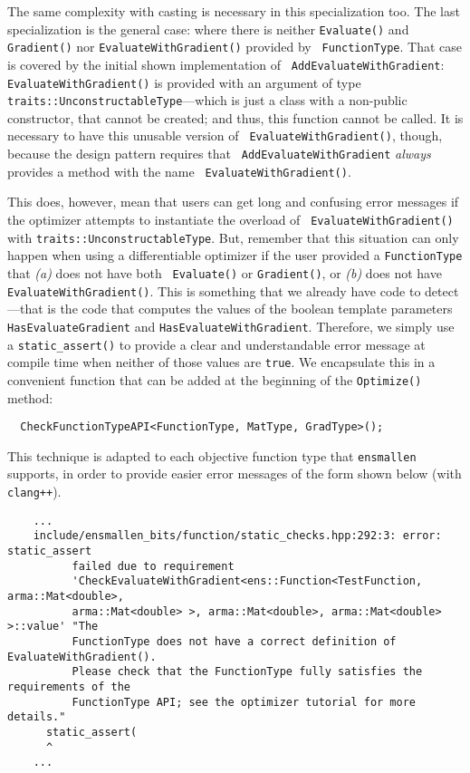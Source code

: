 The same complexity with casting is necessary in this specialization too.  The
last specialization is the general case: where there is neither {\tt Evaluate()}
and {\tt Gradient()} nor {\tt EvaluateWithGradient()} provided by {\tt
FunctionType}.  That case is covered by the initial shown implementation of {\tt
AddEvaluateWithGradient}: {\tt EvaluateWithGradient()} is provided with an
argument of type {\tt traits::UnconstructableType}---which is just a class with
a non-public constructor, that cannot be created; and thus, this function cannot
be called.  It is necessary to have this unusable version of {\tt
EvaluateWithGradient()}, though, because the design pattern requires that {\tt
AddEvaluateWithGradient} {\em always} provides a method with the name {\tt
EvaluateWithGradient()}.

This does, however, mean that users can get long and confusing error messages if
the optimizer attempts to instantiate the overload of {\tt
EvaluateWithGradient()} with {\tt traits::UnconstructableType}.  But, remember
that this situation can only happen when using a differentiable optimizer if
the user provided a {\tt FunctionType} that {\it (a)} does not have both {\tt
Evaluate()} or {\tt Gradient()}, or {\it (b)} does not have {\tt
EvaluateWithGradient()}.  This is something that we already have code to
detect---that is the code that computes the values of the boolean template
parameters {\tt HasEvaluateGradient} and {\tt HasEvaluateWithGradient}.
Therefore, we simply use a {\tt static\_assert()} to provide a clear and
understandable error message at compile time when neither of those values are
{\tt true}.  We encapsulate this in a convenient function that can be added at
the beginning of the {\tt Optimize()} method:

\begin{verbatim}
  CheckFunctionTypeAPI<FunctionType, MatType, GradType>();
\end{verbatim}

This technique is adapted to each objective function type that {\tt ensmallen}
supports, in order to provide easier error messages of the form shown below
(with {\tt clang++}).

\begin{verbatim}
    ...
    include/ensmallen_bits/function/static_checks.hpp:292:3: error: static_assert
          failed due to requirement
          'CheckEvaluateWithGradient<ens::Function<TestFunction, arma::Mat<double>,
          arma::Mat<double> >, arma::Mat<double>, arma::Mat<double> >::value' "The
          FunctionType does not have a correct definition of EvaluateWithGradient().
          Please check that the FunctionType fully satisfies the requirements of the
          FunctionType API; see the optimizer tutorial for more details."
      static_assert(
      ^
    ...
\end{verbatim}

